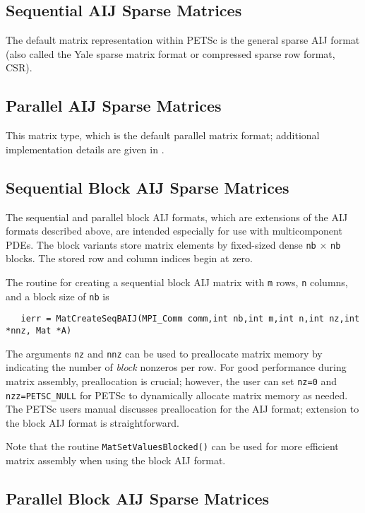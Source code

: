 \subsection{Sequential AIJ Sparse Matrices}

The default matrix representation within PETSc is the general sparse
AIJ format (also called the Yale sparse matrix format or compressed
sparse row format, CSR).

\subsection{Parallel AIJ Sparse Matrices}

This matrix type, which is the
default parallel matrix format; additional implementation details are
given in \cite{efficient}.

\subsection{Sequential Block AIJ Sparse Matrices}

The sequential and parallel block AIJ formats, which are extensions of
the AIJ formats described above, are intended especially for use with
multicomponent PDEs.  The block variants store matrix elements by
fixed-sized dense {\tt nb} $\times$ {\tt nb} blocks.  The stored row
and column indices begin at zero.

The routine for creating a sequential block AIJ matrix with {\tt m} 
rows, {\tt n} columns, and a block size of {\tt nb} is
\begin{verbatim}
   ierr = MatCreateSeqBAIJ(MPI_Comm comm,int nb,int m,int n,int nz,int *nnz, Mat *A)
\end{verbatim}
The arguments {\tt nz} and {\tt nnz} can be used to preallocate matrix
memory by indicating the number of {\em block} nonzeros per row.  For good
performance during matrix assembly, preallocation is crucial; however, the
user can set {\tt nz=0} and {\tt nzz=PETSC\_NULL} for PETSc to dynamically
allocate matrix memory as needed.  The PETSc users manual 
discusses preallocation for the AIJ format; extension to the block AIJ
format is straightforward.

Note that the routine {\tt MatSetValuesBlocked()}
 can be used for more efficient matrix assembly
when using the block AIJ format.
 
\subsection{Parallel Block AIJ Sparse Matrices}

